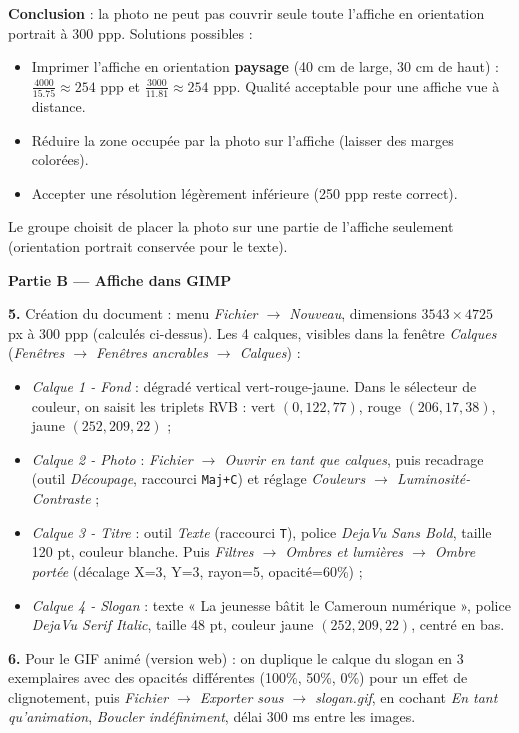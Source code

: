 \documentclass[11pt]{article}
\begin{document}
\begin{exoresolu}
\textbf{Conclusion} : la photo ne peut pas couvrir seule toute l'affiche en orientation portrait à 300 ppp. Solutions possibles :
\begin{itemize}
  \item Imprimer l'affiche en orientation \textbf{paysage} (40 cm de large, 30 cm de haut) : $\frac{4000}{\num{15,75}} \approx 254$ ppp et $\frac{3000}{\num{11,81}} \approx 254$ ppp. Qualité acceptable pour une affiche vue à distance.
  \item Réduire la zone occupée par la photo sur l'affiche (laisser des marges colorées).
  \item Accepter une résolution légèrement inférieure (250 ppp reste correct).
\end{itemize}
Le groupe choisit de placer la photo sur une partie de l'affiche seulement (orientation portrait conservée pour le texte).

\textbf{Partie B — Affiche dans GIMP}

\textbf{5.} Création du document : menu \emph{Fichier $\rightarrow$ Nouveau}, dimensions $3543 \times 4725$ px à 300 ppp (calculés ci-dessus). Les 4 calques, visibles dans la fenêtre \emph{Calques} (\emph{Fenêtres $\rightarrow$ Fenêtres ancrables $\rightarrow$ Calques}) :
\begin{itemize}
  \item \emph{Calque 1 - Fond} : dégradé vertical vert-rouge-jaune. Dans le sélecteur de couleur, on saisit les triplets RVB : vert $(0, 122, 77)$, rouge $(206, 17, 38)$, jaune $(252, 209, 22)$ ;
  \item \emph{Calque 2 - Photo} : \emph{Fichier $\rightarrow$ Ouvrir en tant que calques}, puis recadrage (outil \emph{Découpage}, raccourci \texttt{Maj+C}) et réglage \emph{Couleurs $\rightarrow$ Luminosité-Contraste} ;
  \item \emph{Calque 3 - Titre} : outil \emph{Texte} (raccourci \texttt{T}), police \emph{DejaVu Sans Bold}, taille 120 pt, couleur blanche. Puis \emph{Filtres $\rightarrow$ Ombres et lumières $\rightarrow$ Ombre portée} (décalage X=3, Y=3, rayon=5, opacité=60\%) ;
  \item \emph{Calque 4 - Slogan} : texte « La jeunesse bâtit le Cameroun numérique », police \emph{DejaVu Serif Italic}, taille 48 pt, couleur jaune $(252, 209, 22)$, centré en bas.
\end{itemize}

\textbf{6.} Pour le GIF animé (version web) : on duplique le calque du slogan en 3 exemplaires avec des opacités différentes (100\%, 50\%, 0\%) pour un effet de clignotement, puis \emph{Fichier $\rightarrow$ Exporter sous $\rightarrow$ slogan.gif}, en cochant \emph{En tant qu'animation}, \emph{Boucler indéfiniment}, délai \num{300} ms entre les images.


\end{exoresolu}
\end{document}
